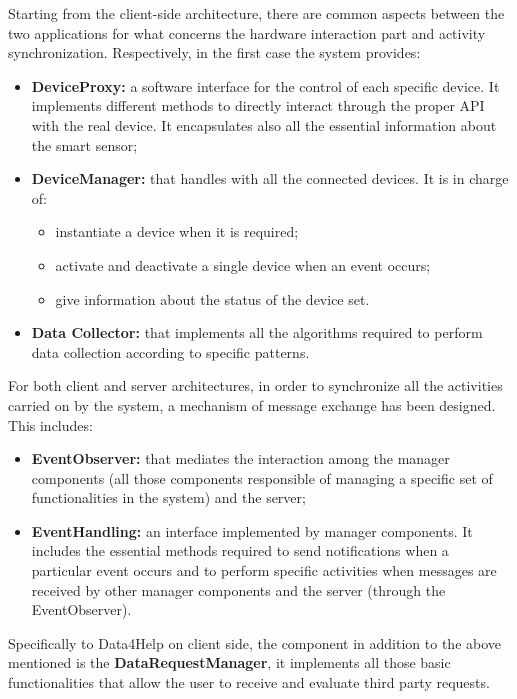 \begin{flushleft}
{{}

Starting from the client-side architecture, there are common aspects between the two applications for what concerns the hardware interaction part and activity synchronization. Respectively, in the first case the system provides:
\begin{itemize}
	\item \textbf{DeviceProxy:} a software interface for the control of each specific device. It implements different methods to directly interact through the proper API with the real device. It encapsulates also all the essential information about the smart sensor;
	\item \textbf{DeviceManager:} that handles with all the connected devices. It is in charge of:
	\begin{itemize}
		\item instantiate a device when it is required;
		\item activate and deactivate a single device when an event occurs; 
		\item give information about the status of the device set.
	\end{itemize}
	\item \textbf{Data Collector:} that implements all the algorithms required to perform data collection according to specific patterns.
\end{itemize}  
For both client and server architectures, in order to synchronize all the activities carried on by the system, a mechanism of message exchange has been designed. This includes:
\begin{itemize}
	\item \textbf{EventObserver:} that mediates the interaction among the manager components (all those components responsible of managing a specific set of functionalities in the system) and the server;
	\item \textbf{EventHandling:} an interface implemented by manager components. It includes the essential methods required to send notifications when a particular event occurs and to perform specific activities when messages are received by other manager components and the server (through the EventObserver).
\end{itemize} 

\newpage
{}
Specifically to Data4Help on client side, the component in addition to the above mentioned is the \textbf{DataRequestManager}, it implements all those basic functionalities that allow the user to receive and evaluate third party requests.

}
\end{flushleft}

